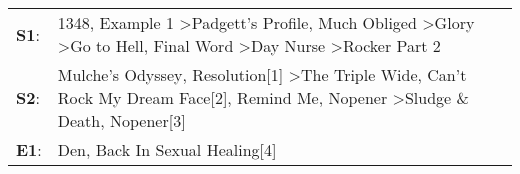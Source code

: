 \begin{supertabular}{p{0.03\textwidth}p{0.92\textwidth}}
 \textbf{S1}:  &  1348\textsuperscript{}, \enspace Example 1\textsuperscript{} \textgreater \enspace Padgett's Profile\textsuperscript{}, \enspace Much Obliged\textsuperscript{} \textgreater \enspace Glory\textsuperscript{} \textgreater \enspace Go to Hell\textsuperscript{}, \enspace Final Word\textsuperscript{} \textgreater \enspace Day Nurse\textsuperscript{} \textgreater \enspace Rocker Part 2\textsuperscript{}  \enspace  \\
 \textbf{S2}:  &                                            Mulche's Odyssey\textsuperscript{}, \enspace Resolution[1]\textsuperscript{} \textgreater \enspace The Triple Wide\textsuperscript{}, \enspace Can't Rock My Dream Face[2]\textsuperscript{}, \enspace Remind Me\textsuperscript{}, \enspace Nopener\textsuperscript{} \textgreater \enspace Sludge \& Death\textsuperscript{}, \enspace Nopener[3]\textsuperscript{}  \enspace  \\
 \textbf{E1}:  &                                                                                                                                                                                                                                                                                                                                      Den\textsuperscript{}, \enspace Back In Sexual Healing[4]\textsuperscript{}  \enspace  \\
\end{supertabular}
